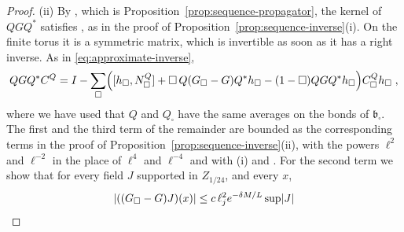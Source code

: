 \documentclass[11pt]{preprint}
\DeclarePairedDelimiter{\abs}{\lvert}{\rvert}
\numberwithin{equation}{section}
\theoremstyle{definition}
\theoremstyle{remark}
\theoremstyle{plain}
\begin{document}
\begin{proof}
(ii) By \cite[(2.136)]{BalabanPRT2}, which is Proposition~\ref{prop:sequence-propagator}, the kernel of $QGQ^*$ satisfies \cite[(2.142)]{BalabanPRT2}, as in the proof of Proposition~\ref{prop:sequence-inverse}(i). On the finite torus it is a symmetric matrix, which is invertible as soon as it has a right inverse. As in \eqref{eq:approximate-inverse},
\begin{equation}\label{eq:qgq-approximate-inverse}
    QGQ^*C^Q = I - \sum_\square\Bigl([h_\square, N^Q_\square] + \square\,Q(G_\square - G)Q^*h_\square - (1 - \square)QGQ^*h_\square\Bigr)C^Q_\square h_\square\;,
\end{equation}
where we have used that $Q$ and $Q_\square$ have the same averages on the bonds of $\mathfrak b_\square$. The first and the third term of the remainder are bounded as the corresponding terms in the proof of Proposition~\ref{prop:sequence-inverse}(ii), with the powers $\ell^2$ and $\ell^{-2}$ in the place of $\ell^4$ and $\ell^{-4}$ and with (i) and \cite[(2.142)]{BalabanPRT2}. For the second term we show that for every field $J$ supported in $Z_{1/24}$, and every $x$,
\begin{equation}\label{eq:propagator-change}
    \abs{((G_\square - G)J)(x)} \leq c\,\ell_j^2e^{-\delta M/L}\sup\abs J
\end{equation}

\end{proof}
\end{document}
